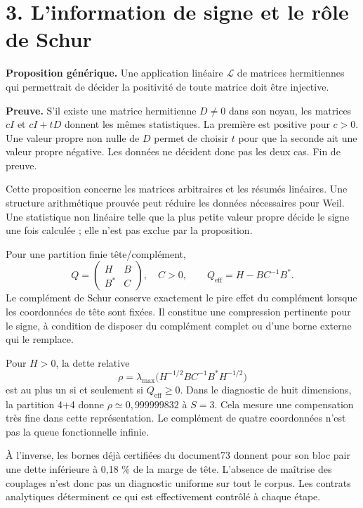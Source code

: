 \documentclass[
  11pt,
]{article}
\begin{document}
\hypertarget{linformation-de-signe-et-le-ruxf4le-de-schur}{%
\section{3. L'information de signe et le rôle de
Schur}\label{linformation-de-signe-et-le-ruxf4le-de-schur}}

\textbf{Proposition générique.} Une application linéaire \(\mathcal L\)
de matrices hermitiennes qui permettrait de décider la positivité de
toute matrice doit être injective.

\textbf{Preuve.} S'il existe une matrice hermitienne \(D\ne0\) dans son
noyau, les matrices \(cI\) et \(cI+tD\) donnent les mêmes statistiques.
La première est positive pour \(c>0\). Une valeur propre non nulle de
\(D\) permet de choisir \(t\) pour que la seconde ait une valeur propre
négative. Les données ne décident donc pas les deux cas. Fin de preuve.

Cette proposition concerne les matrices arbitraires et les résumés
linéaires. Une structure arithmétique prouvée peut réduire les données
nécessaires pour Weil. Une statistique non linéaire telle que la plus
petite valeur propre décide le signe une fois calculée ; elle n'est pas
exclue par la proposition.

Pour une partition finie tête/complément, \[
Q=\begin{pmatrix}H&B\\B^*&C\end{pmatrix},\quad C>0,
\qquad Q_{\mathrm{eff}}=H-BC^{-1}B^*.
\] Le complément de Schur conserve exactement le pire effet du
complément lorsque les coordonnées de tête sont fixées. Il constitue une
compression pertinente pour le signe, à condition de disposer du
complément complet ou d'une borne externe qui le remplace.

Pour \(H>0\), la dette relative \[
\rho=\lambda_{\max}\bigl(H^{-1/2}BC^{-1}B^*H^{-1/2}\bigr)
\] est au plus un si et seulement si \(Q_{\mathrm{eff}}\ge0\). Dans le
diagnostic de huit dimensions, la partition 4+4 donne
\(\rho\simeq0,999999832\) à \(S=3\). Cela mesure une compensation très
fine dans cette représentation. Le complément de quatre coordonnées
n'est pas la queue fonctionnelle infinie.

À l'inverse, les bornes déjà certifiées du document73 donnent pour son
bloc pair une dette inférieure à 0,18 \% de la marge de tête. L'absence
de maîtrise des couplages n'est donc pas un diagnostic uniforme sur tout
le corpus. Les contrats analytiques déterminent ce qui est effectivement
contrôlé à chaque étape.
\end{document}
